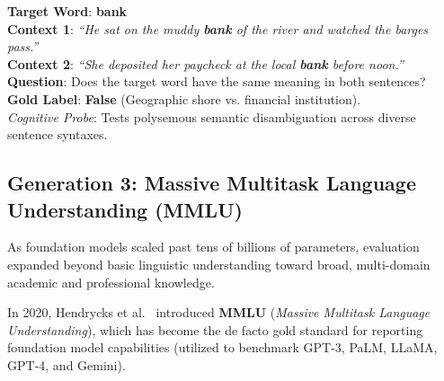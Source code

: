 \documentclass[../../main.tex]{subfiles}
\begin{document}
\begin{center}
\begin{minipage}{0.95\textwidth}
\begin{tcolorbox}[colback=cardBg,colframe=cardLine,arc=2pt,boxrule=0.5pt,title=\textbf{SuperGLUE Benchmark Example: Words in Context (WiC)}]
\small\sffamily
\textbf{Target Word}: \textbf{bank} \\
\textbf{Context 1}: \textit{``He sat on the muddy \textbf{bank} of the river and watched the barges pass.''} \\
\textbf{Context 2}: \textit{``She deposited her paycheck at the local \textbf{bank} before noon.''} \\
\textbf{Question}: Does the target word have the same meaning in both sentences? \\
\textbf{Gold Label}: \textbf{False} (Geographic shore vs. financial institution). \\
\textit{Cognitive Probe}: Tests polysemous semantic disambiguation across diverse sentence syntaxes.
\end{tcolorbox}
\end{minipage}
\end{center}

\subsection{Generation 3: Massive Multitask Language Understanding (MMLU)}
\label{subsec:mmlu}

As foundation models scaled past tens of billions of parameters, evaluation expanded beyond basic linguistic understanding toward broad, multi-domain academic and professional knowledge.

In 2020, Hendrycks et al.~\cite{hendrycks2020mmlu} introduced \textbf{MMLU} (\textit{Massive Multitask Language Understanding}), which has become the de facto gold standard for reporting foundation model capabilities (utilized to benchmark GPT-3, PaLM, LLaMA, GPT-4, and Gemini).
\end{document}
